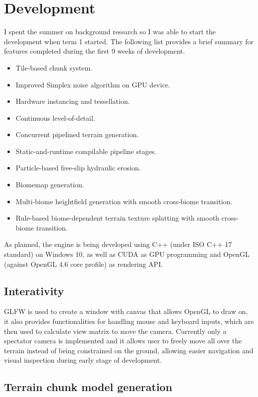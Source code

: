 \documentclass[oneside, a4paper]{article}
\begin{document}
    \section{Development}
    I spent the summer on background research so I was able to start the development when term 1 started. The following list provides a brief summary for features completed during the first 9 weeks of development.

    \begin{itemize}[label=\(\diamond\)]
        \item Tile-based chunk system.
        \item Improved Simplex noise algorithm on GPU device.
        \item Hardware instancing and tessellation.
        \item Continuous level-of-detail.
        \item Concurrent pipelined terrain generation.
        \item Static-and-runtime compilable pipeline stages.
        \item Particle-based free-slip hydraulic erosion.
        \item Biomemap generation.
        \item Multi-biome heightfield generation with smooth cross-biome transition.
        \item Rule-based biome-dependent terrain texture splatting with smooth cross-biome transition.
    \end{itemize}

    As planned, the engine is being developed using C++ (under ISO C++ 17 standard) on Windows 10, as well as CUDA as GPU programming and OpenGL (against OpenGL 4.6 core profile) as rendering API.

    \subsection{Interativity}

    GLFW \cite{glfw} is used to create a window with canvas that allows OpenGL to draw on, it also provides functionalities for handling mouse and keyboard inputs, which are then used to calculate view matrix to move the camera. Currently only a spectator camera is implemented and it allows user to freely move all over the terrain instead of being constrained on the ground, allowing easier navigation and visual inspection during early stage of development.

    \subsection{Terrain chunk model generation}
\end{document}

